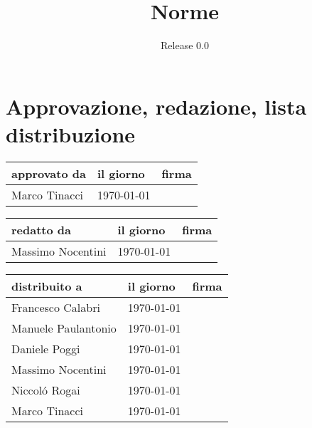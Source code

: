 \documentclass[a4paper, 12pt]{report}
\title{Norme}
\author{Release 0.0}
\date{\today \\Firenze \\\begin{figure}[h] \centering \texttt{[image: ../images/logokiwi.png]} \end{figure} }
\begin{document}
\maketitle

\section*{Approvazione, redazione, lista distribuzione}
\begin{table}[h!]
  \begin{center}
    \begin{tabular}{| l | l | p{60mm} |}
    \hline
    \textbf{approvato da} & \textbf{il giorno} & \textbf{firma} \\
	\hline    
	Marco Tinacci & \today &  \\
    \hline
    \end{tabular}
  \end{center}
\end{table}

\begin{table}[h!]
  \begin{center}
    \begin{tabular}{| l | l | p{60mm} |}
    \hline
    \textbf{redatto da} & \textbf{il giorno} & \textbf{firma} \\
	\hline    
	Massimo Nocentini & \today &  \\
    \hline
    \end{tabular}
  \end{center}
\end{table}

\begin{table}[h!]
  \begin{center}
    \begin{tabular}{| l | l | p{60mm} |}
    \hline
    \textbf{distribuito a} & \textbf{il giorno} & \textbf{firma} \\
	\hline    
	Francesco Calabri & \today &  \\
    \hline
	Manuele Paulantonio & \today &  \\
    \hline
	Daniele Poggi & \today &  \\
    \hline
	Massimo Nocentini & \today &  \\
    \hline
	Niccol\'o Rogai & \today &  \\
    \hline
	Marco Tinacci & \today &  \\
    \hline
    \end{tabular}
  \end{center}
\end{table}
\end{document}
